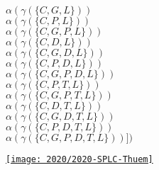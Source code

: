 \begin{frame}{\myframetitle}
\begin{mycolumns}
{{			}{
				$\alpha(\gamma(\{C,G,L\}))$\\
				$\alpha(\gamma(\{C,P,L\}))$\\
				$\alpha(\gamma(\{C,G,P,L\}))$\\
				$\alpha(\gamma(\{C,D,L\}))$\\
				$\alpha(\gamma(\{C,G,D,L\}))$\\
				$\alpha(\gamma(\{C,P,D,L\}))$\\
				$\alpha(\gamma(\{C,G,P,D,L\}))$\\
				$\alpha(\gamma(\{C,P,T,L\}))$\\
				$\alpha(\gamma(\{C,G,P,T,L\}))$\\
				$\alpha(\gamma(\{C,D,T,L\}))$\\
				$\alpha(\gamma(\{C,G,D,T,L\}))$\\
				$\alpha(\gamma(\{C,P,D,T,L\}))$\\
				$\alpha(\gamma(\{C,G,P,D,T,L\}))])$
			}
		}
	\end{mycolumns}
\end{frame}

\begin{frame}[fragile]{\myframetitle}
	\begin{mycolumns}[columns=3,widths={25,50,25}]
	\mynextcolumn
		\hspace*{-6mm}\href{https://dl.acm.org/doi/abs/10.1145/3382025.3414943}{\texttt{[image: 2020/2020-SPLC-Thuem]}}
	\mynextcolumn
	\end{mycolumns}
\end{frame}



